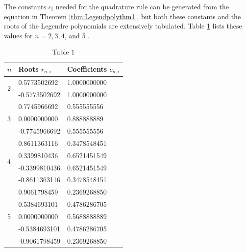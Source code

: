 %
%
%
%
%
%
%
%
%
%
%
The constants $c_{i}$ needed for the quadrature rule can be generated from the equation in Theorem \ref{thm:Legendpolythm1}, but both these constants and the roots of the Legendre polynomials are extensively tabulated. Table \ref{legendpolytable1} lists these values for $n=2,3,4$, and 5 .

\begin{table}[h]
\centering
\begin{tabular}{|l|l|l|}
\hline
$n$ & Roots $r_{n, i}$ & Coefficients $c_{n, i}$ \\
\hline
\multirow[t]{2}{*}{2} & 0.5773502692 & 1.0000000000 \\
\hline
 & -0.5773502692 & 1.0000000000 \\
\hline
\multirow[t]{3}{*}{3} & 0.7745966692 & 0.555555556 \\
\hline
 & 0.0000000000 & 0.888888889 \\
\hline
 & -0.7745966692 & 0.555555556 \\
\hline
\multirow[t]{4}{*}{4} & 0.8611363116 & 0.3478548451 \\
\hline
 & 0.3399810436 & 0.6521451549 \\
\hline
 & -0.3399810436 & 0.6521451549 \\
\hline
 & -0.8611363116 & 0.3478548451 \\
\hline
\multirow[t]{5}{*}{5} & 0.9061798459 & 0.2369268850 \\
\hline
 & 0.5384693101 & 0.4786286705 \\
\hline
 & 0.0000000000 & 0.5688888889 \\
\hline
 & -0.5384693101 & 0.4786286705 \\
\hline
 & -0.9061798459 & 0.2369268850 \\
\hline
\end{tabular}
\caption{\scriptsize Table $1$}
\label{legendpolytable1}
\end{table}

